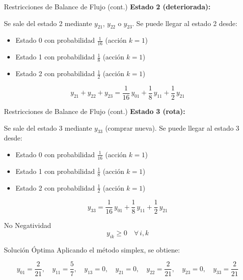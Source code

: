 \documentclass{beamer}
\begin{document}
\begin{frame}{Restricciones de Balance de Flujo (cont.)}
    \small
    \textbf{Estado 2 (deteriorada):}

    \vspace{0.3em}

    Se sale del estado 2 mediante $y_{21}$, $y_{22}$ o $y_{23}$. Se puede llegar al estado 2 desde:
    \begin{itemize}
        \item Estado 0 con probabilidad $\frac{1}{16}$ (acción $k=1$)
        \item Estado 1 con probabilidad $\frac{1}{8}$ (acción $k=1$)
        \item Estado 2 con probabilidad $\frac{1}{2}$ (acción $k=1$)
    \end{itemize}

    \[
    y_{21} + y_{22} + y_{23} = \frac{1}{16}\,y_{01} + \frac{1}{8}\,y_{11} + \frac{1}{2}\,y_{21}
    \]
\end{frame}

\begin{frame}{Restricciones de Balance de Flujo (cont.)}
    \small
    \textbf{Estado 3 (rota):}

    \vspace{0.3em}

    Se sale del estado 3 mediante $y_{33}$ (comprar nueva). Se puede llegar al estado 3 desde:
    \begin{itemize}
        \item Estado 0 con probabilidad $\frac{1}{16}$ (acción $k=1$)
        \item Estado 1 con probabilidad $\frac{1}{8}$ (acción $k=1$)
        \item Estado 2 con probabilidad $\frac{1}{2}$ (acción $k=1$)
    \end{itemize}

    \[
    y_{33} = \frac{1}{16}\,y_{01} + \frac{1}{8}\,y_{11} + \frac{1}{2}\,y_{21}
    \]
\end{frame}

\begin{frame}{No Negatividad}
    \[
    y_{ik} \geq 0 \quad \forall\, i, k
    \]
\end{frame}

\begin{frame}{Solución Óptima}
    \small
    Aplicando el método simplex, se obtiene:

    \[
    y_{01} = \frac{2}{21}, \quad y_{11} = \frac{5}{7}, \quad y_{13} = 0, \quad y_{21} = 0, \quad y_{22} = \frac{2}{21}, \quad y_{23} = 0, \quad y_{33} = \frac{2}{21}
    \]
\end{frame}
\end{document}
